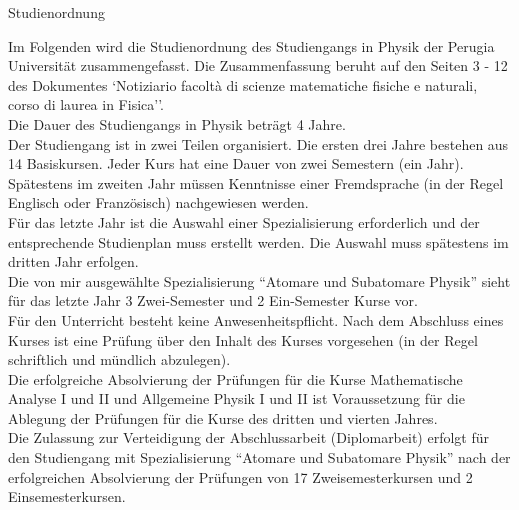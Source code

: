 \documentclass[a4paper,11pt]{article}
\begin{document}
\pagestyle{empty}
\begin{center}
  \huge{Studienordnung}
\end{center}
\vspace{1cm}

Im Folgenden wird die Studienordnung des Studiengangs in Physik der Perugia
Universit\"at zusammengefasst. Die Zusammenfassung beruht auf den Seiten 3 - 12
des Dokumentes `Notiziario facolt\`a di scienze matematiche fisiche e naturali,
corso di laurea in Fisica''.\\

Die Dauer des Studiengangs in Physik betr\"agt 4 Jahre.\\

Der Studiengang ist in zwei Teilen organisiert. Die ersten drei Jahre bestehen
aus 14 Basiskursen. Jeder Kurs hat eine Dauer von zwei Semestern (ein Jahr).\\

Sp\"atestens im zweiten Jahr m\"ussen Kenntnisse einer Fremdsprache (in der Regel
Englisch oder Franz\"osisch) nachgewiesen werden.\\

F\"ur das letzte Jahr ist die Auswahl einer Spezialisierung erforderlich und der
entsprechende Studienplan muss erstellt werden. Die Auswahl muss sp\"atestens im 
dritten Jahr erfolgen.\\

Die von mir ausgew\"ahlte Spezialisierung ``Atomare und Subatomare Physik''
sieht f\"ur das letzte Jahr 3 Zwei-Semester und 2 Ein-Semester Kurse vor.\\

F\"ur den Unterricht besteht keine Anwesenheitspflicht. Nach dem Abschluss eines
Kurses ist eine Pr\"ufung \"uber den Inhalt des Kurses vorgesehen (in der Regel
schriftlich  und  m\"undlich abzulegen).\\

Die erfolgreiche Absolvierung der Pr\"ufungen f\"ur die Kurse Mathematische
Analyse I und II und Allgemeine Physik I und II ist Voraussetzung f\"ur die
Ablegung der Pr\"ufungen f\"ur die Kurse des dritten und vierten Jahres.\\

Die Zulassung zur Verteidigung der Abschlussarbeit (Diplomarbeit) erfolgt f\"ur
den Studiengang mit Spezialisierung ``Atomare und Subatomare Physik'' nach der
erfolgreichen Absolvierung der Pr\"ufungen von 17 Zweisemesterkursen und 2
Einsemesterkursen.\\
\end{document}
